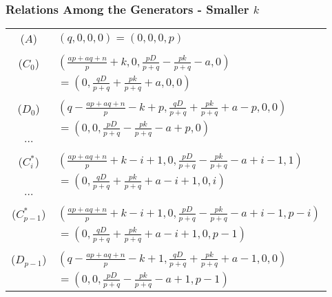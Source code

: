 \documentclass{beamer}
\begin{document}

\begin{frame}[noframenumbering]
\begin{center}
\frametitle{Relations Among the Generators - Smaller $k$}

{\tiny
\begin{center}
\begin{tabular}{cl}
($A$) & $\left(q, 0, 0, 0\right)=\left(0, 0, 0, p\right)$\\
 &\\
($C_0$) & $\left(\frac{a p + a q + n}{p} + k, 0, \frac{p D}{p + q} - \frac{p k}{p + q} - a , 0\right)$\\
 & $ = \left(0, \frac{q D}{p + q} + \frac{p k}{p + q} + a, 0, 0\right)$\\
 &\\
($D_0$) & $\left(q - \frac{a p + a q + n}{p} - k + p, \frac{q D}{p + q} + \frac{p k}{p + q} + a - p, 0, 0\right)$\\
 & $ = \left(0, 0, \frac{p D}{p + q} - \frac{p k}{p + q} - a + p, 0\right)$\\
$\cdots$ &\\
 &\\
($C_i ^ *$) & $\left(\frac{a p + a q + n}{p} + k - i + 1, 0, \frac{p D}{p + q} - \frac{p k}{p + q} - a + i - 1, 1\right)$\\
 & $ = \left(0, \frac{q D}{p + q} + \frac{p k}{p + q} + a - i + 1, 0, i\right)$\\
$\cdots$ &\\
 &\\
($C_{p - 1} ^ *$) & $\left(\frac{a p + a q + n}{p} + k - i + 1, 0, \frac{p D}{p + q} - \frac{p k}{p + q} - a + i - 1, p - i\right)$\\
 & $ = \left(0, \frac{q D}{p + q} + \frac{p k}{p + q} + a - i + 1, 0, p - 1\right)$\\
 &\\
($D_{p - 1}$) & $\left(q - \frac{a p + a q + n}{p} - k + 1, \frac{q D}{p + q} + \frac{p k}{p + q} + a - 1, 0, 0\right)$\\
 & $ = \left(0, 0, \frac{p D}{p + q} - \frac{p k}{p + q} - a + 1, p - 1\right)$\\
\end{tabular}
\end{center}
}

\end{center}
\end{frame}

\end{document}

